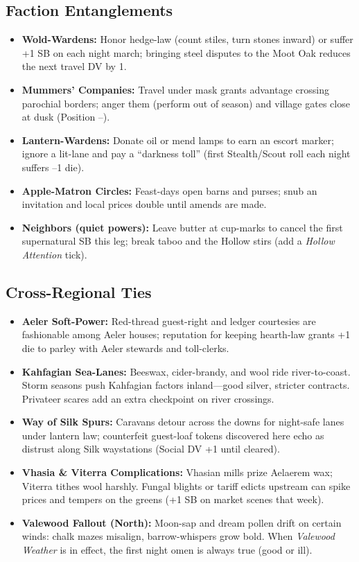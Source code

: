 \subsection*{Faction Entanglements}
\begin{itemize}
  \item \textbf{Wold-Wardens:} Honor hedge-law (count stiles, turn stones inward) or suffer +1 SB on each night march; bringing steel disputes to the Moot Oak reduces the next travel DV by 1.
  \item \textbf{Mummers' Companies:} Travel under mask grants advantage crossing parochial borders; anger them (perform out of season) and village gates close at dusk (Position --).
  \item \textbf{Lantern-Wardens:} Donate oil or mend lamps to earn an escort marker; ignore a lit-lane and pay a “darkness toll” (first Stealth/Scout roll each night suffers --1 die).
  \item \textbf{Apple-Matron Circles:} Feast-days open barns and purses; snub an invitation and local prices double until amends are made.
  \item \textbf{Neighbors (quiet powers):} Leave butter at cup-marks to cancel the first supernatural SB this leg; break taboo and the Hollow stirs (add a \emph{Hollow Attention} tick).
\end{itemize}

\subsection*{Cross-Regional Ties}
\begin{itemize}
  \item \textbf{Aeler Soft-Power:} Red-thread guest-right and ledger courtesies are fashionable among Aeler houses; reputation for keeping hearth-law grants +1 die to parley with Aeler stewards and toll-clerks.
  \item \textbf{Kahfagian Sea-Lanes:} Beeswax, cider-brandy, and wool ride river-to-coast. Storm seasons push Kahfagian factors inland—good silver, stricter contracts. Privateer scares add an extra checkpoint on river crossings.
  \item \textbf{Way of Silk Spurs:} Caravans detour across the downs for night-safe lanes under lantern law; counterfeit guest-loaf tokens discovered here echo as distrust along Silk waystations (Social DV +1 until cleared).
  \item \textbf{Vhasia \& Viterra Complications:} Vhasian mills prize Aelaerem wax; Viterra tithes wool harshly. Fungal blights or tariff edicts upstream can spike prices and tempers on the greens (+1 SB on market scenes that week).
  \item \textbf{Valewood Fallout (North):} Moon-sap and dream pollen drift on certain winds: chalk mazes misalign, barrow-whispers grow bold. When \emph{Valewood Weather} is in effect, the first night omen is always true (good or ill).
\end{itemize}

